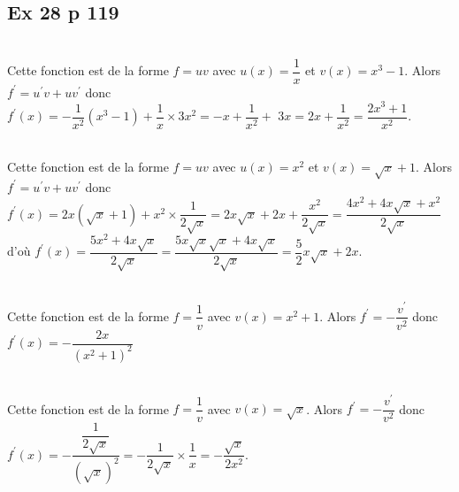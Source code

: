 \documentclass[12pt,a5paper]{book}
\begin{document}
\subsection*{Ex 28 p 119}

\begin{enumMet}
    \item {}\\
    Cette fonction est de la forme $f=u v$ avec $u(x)=\dfrac{1}{x}$ et $v(x)=x^{3}-1$. Alors $f^{\prime}=u^{\prime} v+u v^{\prime}$ donc\\
    $ f^{\prime}(x)=-\dfrac{1}{x^{2}}\left(x^{3}-1\right)+\dfrac{1}{x} \times 3 x^{2}=-x+\dfrac{1}{x^{2}}+$ $3 x=2 x+\dfrac{1}{x^{2}}=\dfrac{2 x^{3}+1}{x^{2}}$.
    \newpage
    \item {}\\
    Cette fonction est de la forme $f=u v$ avec $u(x)=x^{2}$ et $v(x)=\sqrt{x}+1$. Alors  $f^{\prime}=u^{\prime} v+u v^{\prime}$ donc\\
    $f^{\prime}(x)=2 x(\sqrt{x}+1)+x^{2} \times \dfrac{1}{2 \sqrt{x}}=2 x \sqrt{x}+2 x+\dfrac{x^{2}}{2 \sqrt{x}}=\dfrac{4 x^{2}+4 x \sqrt{x}+x^{2}}{2 \sqrt{x}}$\\
d'où $f^{\prime}(x)=\dfrac{5 x^{2}+4 x \sqrt{x}}{2 \sqrt{x}}=\dfrac{5x\sqrt{x}\sqrt{x}+4x\sqrt{x}}{2\sqrt{x}}=\dfrac{5}{2}x\sqrt{x}+2x$.
    \item {}\\
Cette fonction est de la forme $f=\dfrac{1}{v}$ avec $v(x)=x^{2}+1$. Alors $f^{\prime}=-\dfrac{v^{\prime}}{v^{2}}$ donc\\ $f^{\prime}(x)=-\dfrac{2 x}{\left(x^{2}+1\right)^{2}}$
    \item {}\\
Cette fonction est de la forme $f=\dfrac{1}{v}$ avec $v(x)=\sqrt{x}$. Alors $f^{\prime}=-\dfrac{v^{\prime}}{v^{2}}$ donc\\ $f^{\prime}(x)=-\dfrac{\dfrac{1}{2 \sqrt{x}}}{(\sqrt{x})^{2}}=-\dfrac{1}{2 \sqrt{x}} \times \dfrac{1}{x}=-\dfrac{\sqrt{x}}{2 x^{2}}$.
\end{enumMet}
\end{document}
